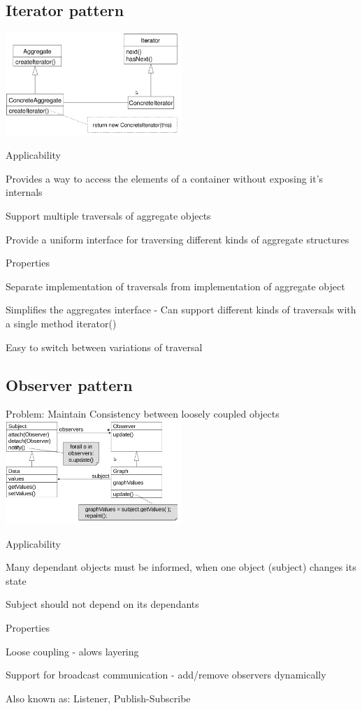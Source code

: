 \subsection{Iterator pattern}
\includegraphics[width=0.5\textwidth]{img/iterator_pattern.png}
\enumstart
	\item Applicability
	\enumstart
		\item Provides a way to access the elements of a container without exposing it's internals
		\item Support multiple traversals of aggregate objects
		\item Provide a uniform interface for traversing different kinds of aggregate structures
	\enumend
	\item Properties
	\enumstart
		\item Separate implementation of traversals from implementation of aggregate object
		\item Simplifies the aggregates interface - Can support different kinds of traversals with a single method iterator()
		\item Easy to switch between variations of traversal
	\enumend
\enumend

\subsection{Observer pattern}
\enumstart
	\item Problem: Maintain Consistency between loosely coupled objects
	\\ \includegraphics[width=0.5\textwidth]{img/observer_pattern.png}
	\item Applicability
	\enumstart
		\item Many dependant objects must be informed, when one object (subject) changes its state
		\item Subject should not depend on its dependants
	\enumend
	\item Properties
	\enumstart
		\item Loose coupling - alows layering
		\item Support for broadcast communication - add/remove observers dynamically
		\item Also known as: Listener, Publish-Subscribe
	\enumend
\enumend

